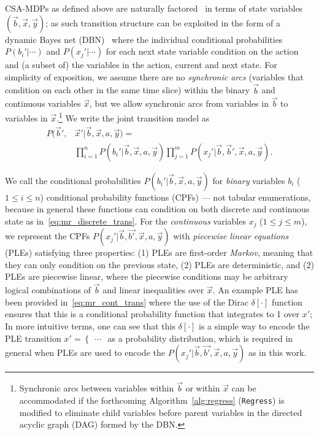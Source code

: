CSA-MDPs as defined above are naturally factored~\cite{boutilier99dt}
in terms of state variables $(\vec{b},\vec{x},\vec{y})$; as such
transition structure can be exploited in the form of a dynamic Bayes
net (DBN)~\cite{dbn} where the individual conditional probabilities
$P(b_i'|\cdots)$ and $P(x_j'|\cdots)$ for each next state variable
condition on the action and (a subset of) the variables in the action,
current and next state.  For simplicity of exposition, we assume there
are no \emph{synchronic arcs} (variables that condition on each other
in the same time slice) within the binary $\vec{b}$ and continuous
variables $\vec{x}$, but we allow synchronic arcs from variables in
$\vec{b}$ to variables in $\vec{x}$.\footnote{Synchronic arcs between
variables within $\vec{b}$ or within $\vec{x}$ can be accommodated if
the forthcoming Algorithm~\ref{alg:regress} (\texttt{Regress}) 
is modified to
eliminate child variables before parent variables in the directed
acyclic graph (DAG) formed by the DBN.}  We write the joint transition
model as
\begin{align}
P(\vec{b}',&\vec{x}'|\vec{b},\vec{x},a,\vec{y}) = \label{eq:dbn} \\
& \prod_{i=1}^n P(b_i'|\vec{b},\vec{x},a,\vec{y}) \prod_{j=1}^m P(x_j'|\vec{b},\vec{b}',\vec{x},a,\vec{y}). \nonumber 
\end{align}


We call the conditional probabilities
$P(b_i'|\vec{b},\vec{x},a,\vec{y})$ for \emph{binary} variables $b_i$
($1 \leq i \leq n$) conditional probability functions (CPFs) --- not
tabular enumerations, because in general these functions can condition
on both discrete and continuous state as
in~\eqref{eq:mr_discrete_trans}.  For the \emph{continuous} variables
$x_j$ ($1 \leq j \leq m$), we represent the CPFs
$P(x_j'|\vec{b},\vec{b'},\vec{x},a,\vec{y})$ with \emph{piecewise
linear equations} (PLEs) satisfying three properties: (1) PLEs are
first-order \emph{Markov}, meaning that they can only condition on the
previous state, (2) PLEs are deterministic, and (2) PLEs are piecewise
linear, where the piecewise conditions may be arbitrary logical
combinations of $\vec{b}$ and linear inequalities over $\vec{x}$.  An
example PLE has been provided in~\eqref{eq:mr_cont_trans} where the
use of the Dirac $\delta[\cdot]$ function ensures that this is a
conditional probability function that integrates to 1 over $x'$; In
more intuitive terms, one can see that this $\delta[\cdot]$ is a
simple way to encode the PLE transition $x' = \begin{cases} \ldots
\end{cases}$ as a probability distribution, which is required in
general when PLEs are used to encode the
$P(x_j'|\vec{b},\vec{b'},\vec{x},a,\vec{y})$ as in this work.

